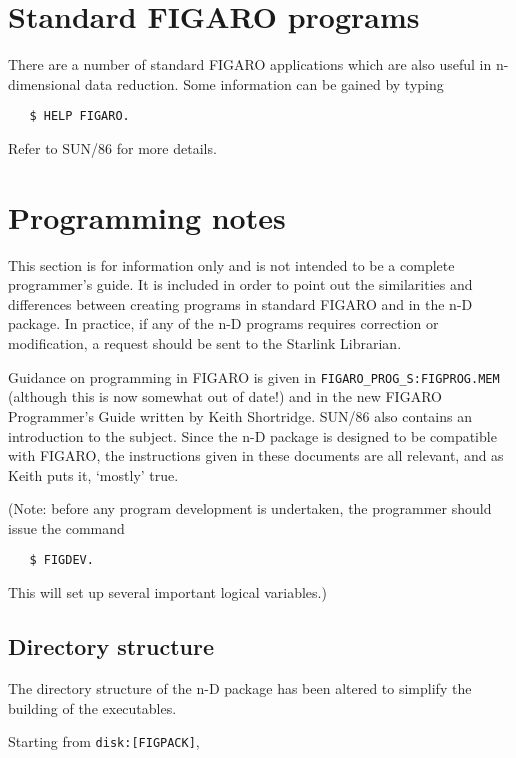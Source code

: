 \section{Standard FIGARO programs}

There are a number of standard FIGARO applications which are also useful in
n-dimensional data reduction. Some information can be gained by typing
\begin{verbatim}
   $ HELP FIGARO.
\end{verbatim}
Refer to SUN/86 for more details.


\section{Programming notes}
\label{prog}

This section is for information only and is not intended to be a complete 
programmer's guide. It is included in order to point out the similarities
and differences between creating programs in standard FIGARO and in the
n-D package. In practice, if any of the n-D programs requires correction
or modification, a request should be sent to the Starlink Librarian.

Guidance on programming in FIGARO is given in {\tt FIGARO\_PROG\_S:FIGPROG.MEM}
(although this is now somewhat out of date!)
and in the new FIGARO Programmer's Guide written by Keith Shortridge. 
SUN/86 also contains an introduction to the subject. Since the n-D package is 
designed to be compatible with FIGARO, the instructions given in these 
documents are all relevant, and as Keith puts it, `mostly' true.

(Note: before any program development is undertaken, the programmer should 
issue the command
\begin{verbatim}
   $ FIGDEV.
\end{verbatim}
This will set up several important logical variables.)

\subsection{Directory structure}

The directory structure of the n-D package has been altered to simplify the
building of the executables.

Starting from {\tt disk:[FIGPACK]},

